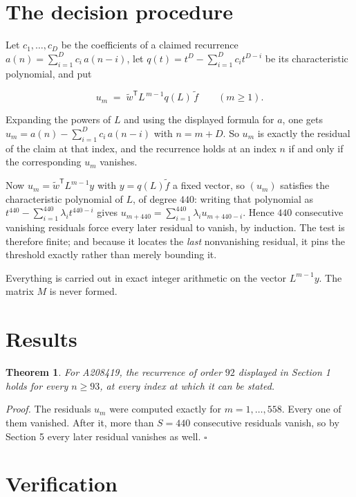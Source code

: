 \documentclass[11pt]{article}
\newtheorem{theorem}{Theorem}
\theoremstyle{definition}
\begin{document}
\section{The decision procedure}

Let $c_1,\dots,c_D$ be the coefficients of a claimed recurrence $a(n) = \sum_{i=1}^{D} c_i\,a(n-i)$, let $q(t) = t^{D} - \sum_{i=1}^{D} c_i t^{D-i}$ be its characteristic polynomial, and put

\[u_m \;=\; \tilde w^{\mathsf T} L^{\,m-1} q(L)\,\tilde f \qquad (m \ge 1).\]

Expanding the powers of $L$ and using the displayed formula for $a$, one gets $u_m = a(n) - \sum_{i=1}^{D} c_i\,a(n-i)$ with $n = m + D$. So $u_m$ is exactly the residual of the claim at that index, and the recurrence holds at an index $n$ if and only if the corresponding $u_m$ vanishes.

Now $u_m = \tilde w^{\mathsf T} L^{m-1} y$ with $y = q(L)\tilde f$ a fixed vector, so $(u_m)$ satisfies the characteristic polynomial of $L$, of degree $440$: writing that polynomial as $t^{440} - \sum_{i=1}^{440} \lambda_i t^{440-i}$ gives $u_{m+440} = \sum_{i=1}^{440} \lambda_i u_{m+440-i}$. Hence $440$ consecutive vanishing residuals force every later residual to vanish, by induction. The test is therefore finite; and because it locates the {\itshape last} nonvanishing residual, it pins the threshold exactly rather than merely bounding it.

Everything is carried out in exact integer arithmetic on the vector $L^{m-1}y$. The matrix $M$ is never formed.

\section{Results}

\begin{theorem} For A208419, the recurrence of order $92$ displayed in Section 1 holds for every $n \ge 93$, at every index at which it can be stated.\end{theorem}

{\itshape Proof.} The residuals $u_m$ were computed exactly for $m = 1,\dots,558$. Every one of them vanished. After it, more than $S = 440$ consecutive residuals vanish, so by Section 5 every later residual vanishes as well. $\square$

\section{Verification}
\end{document}
